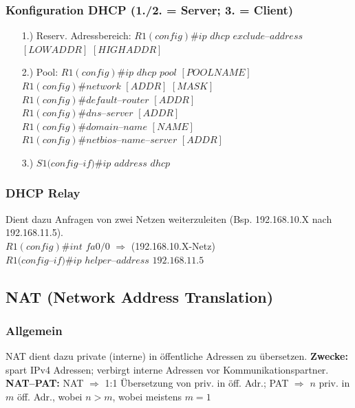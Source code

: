 \documentclass[landscape,twocolumn,a4paper]{article}
\newcommand{\Ra}{\Rightarrow}
\begin{document}
\begin{footnotesize}
\subsubsection{Konfiguration DHCP (1./2. = Server; 3. = Client)}
\begin{itemize}
	\item[1.)] Reserv. Adressbereich:
	$R1(config)\#ip$ $dhcp$ $exclude$--$address$ $[LOW ADDR]$ $[HIGH ADDR]$
	\item[2.)] Pool: $R1(config)\#ip$ $dhcp$ $pool$ $[POOLNAME]$\\
	$R1(config)\#network$ $[ADDR]$ $[MASK]$\\
	$R1(config)\#default$--$router$ $[ADDR]$\\
	$R1(config)\#dns$--$server$ $[ADDR]$\\
	$R1(config)\#domain$--$name$ $[NAME]$\\
	$R1(config)\#netbios$--$name$--$server$ $[ADDR]$
	\item[3.)] $S1(config$--$if)\#ip$ $address$ $dhcp$
\end{itemize}

\subsubsection{DHCP Relay}
Dient dazu Anfragen von zwei Netzen weiterzuleiten (Bsp. 192.168.10.X nach 192.168.11.5).\\
$R1(config)\#int$ $fa0/0$ $\Ra$ (192.168.10.X-Netz)\\
$R1(config$--$if)\#ip$ $helper$--$address$ $192.168.11.5$

\subsection{NAT (Network Address Translation)}
\subsubsection{Allgemein}
NAT dient dazu private (interne) in öffentliche Adressen zu übersetzen. \textbf{Zwecke:} spart IPv4 Adressen; verbirgt interne Adressen vor Kommunikationspartner.\\
\textbf{NAT--PAT:} NAT $\Ra$ 1:1 Übersetzung von priv. in öff. Adr.; PAT $\Ra$ $n$ priv. in $m$ öff. Adr., wobei $n>m$, wobei meistens $m=1$

\end{footnotesize}
\end{document}
